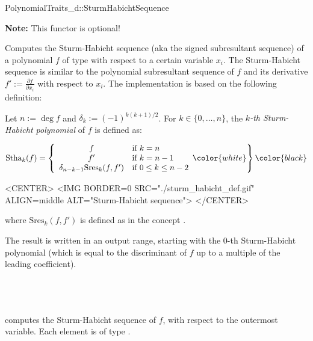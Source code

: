 \begin{ccRefConcept}{PolynomialTraits_d::SturmHabichtSequence}

\textbf{Note:} This functor is optional!

\ccDefinition

Computes the Sturm-Habicht sequence 
(aka the signed subresultant sequence)
of a polynomial $f$ of type 
 with respect to a certain variable $x_i$.
The Sturm-Habicht sequence is similar to the polynomial subresultant sequence
of $f$ and its derivative $f':=\frac{\partial f}{\partial x_i}$
with respect to $x_i$. The implementation is based on the following definition:

Let $n:=\deg f$ and $\delta_k:=(-1)^{k(k+1)/2}$. 
For $k\in\{0,\ldots,n\}$, the {\it $k$-th Sturm-Habicht polynomial} 
of $f$ is defined as:

\begin{ccTexOnly}
$$\mathrm{Stha}_k(f)=\left\{\begin{array}{cl}
f & \textrm{if\ } k=n\\
f' & \textrm{if\ } k=n-1\\
\delta_{n-k-1}\mathrm{Sres}_k(f,f') &\textrm{if\ } 0\leq k\leq n-2
\end{array}\color{white}\right\}\color{black}$$
\end{ccTexOnly}

\begin{ccHtmlOnly}
<CENTER>
<IMG BORDER=0 SRC="./sturm_habicht_def.gif" ALIGN=middle ALT="Sturm-Habicht sequence">
</CENTER>
\end{ccHtmlOnly}

where $\mathrm{Sres}_k(f,f')$ is defined 
as in the concept .

The result is written in an output range, 
starting with the $0$-th Sturm-Habicht polynomial (which is equal to
the discriminant of $f$ up to a multiple of the leading coefficient).

\ccRefines 
{}\\
\\
\\


\ccOperations
{}
         { computes the Sturm-Habicht sequence of $f$, 
           with respect to the outermost variable. Each element is of type
           .}


\end{ccRefConcept}

